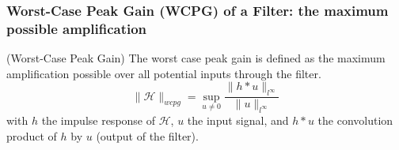	\subsubsection{Worst-Case Peak Gain (WCPG) of a Filter: the maximum possible amplification}
	\begin{thdef} (Worst-Case Peak Gain)
		The worst case peak gain is defined as the maximum amplification
		possible over all potential inputs through the filter.
		$$\|\mathcal{H}\|_{wcpg}=\sup_{u\neq0}\frac{\|h*u\|_{l^{\infty}}}{\|u\|_{l^{\infty}}}$$
		with $h$ the impulse response of $\mathcal{H}$, $u$ the input signal, and $h * u$ the convolution product of $h$ by $u$ (output of the
				filter).
	
	\end{thdef}

%
%
%

